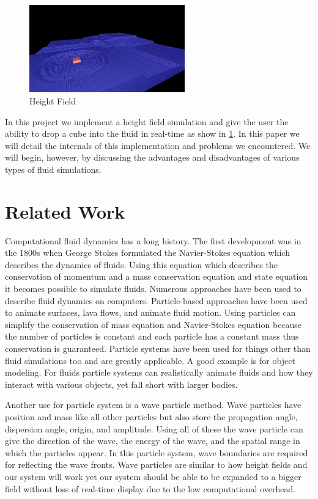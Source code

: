 \documentclass[11pt]{article}
\begin{document}
\begin{figure}[H]
    \caption{Height Field}
    \label{fig:field}
    \centering
    \includegraphics[width=0.6\textwidth]{../www/images/field}
\end{figure}

In this project we implement a height field simulation and give the user the 
ability to drop a cube into the fluid in real-time as show in \ref{fig:field}. 
In this paper we will detail the internals of this implementation and problems 
we encountered. We will begin, however, by discussing the advantages and 
disadvantages of various types of fluid simulations.

\section{Related Work}

Computational fluid dynamics has a long history. The first development was in 
the 1800s when George Stokes formulated the Navier-Stokes equation which 
describes the dynamics of fluids. Using this equation which describes the 
conservation of momentum and a mass conservation equation and state equation it 
becomes possible to simulate fluids. \cite{particle}
Numerous approaches have been used to describe fluid dynamics on computers. 
Particle-based approaches have been used to animate surfaces, lava flows, and 
animate fluid motion. \cite{smooth}\cite{dynamic}\cite{implicit} Using 
particles can simplify the conservation of mass equation and Navier-Stokes 
equation because the number of particles is constant and each particle has a 
constant mass thus conservation is guaranteed.
Particle systems have been used for things other than fluid simulations too and 
are greatly applicable. A good example is for object modeling. \cite{oriented} 
For fluids 
particle systems can realistically animate fluids and how they interact with 
various objects, yet fall short with larger bodies. \cite{particle}

Another use for particle system is a wave particle method. Wave particles have 
position and mass like all other particles but also store the propagation 
angle, dispersion angle, origin, and amplitude. Using all of these the wave 
particle can give the direction of the wave, the energy of the wave, and the 
spatial range in which the particles appear. In this particle system, wave 
boundaries are required for reflecting the wave fronts. \cite{realtime} Wave 
particles are similar to how height fields and our system will work yet our 
system should be able to be expanded to a bigger field without loss of 
real-time display due to the low computational overhead.
\end{document}
